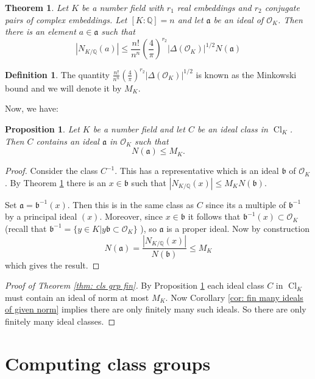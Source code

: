 \documentclass[11pt,a4paper]{report}
\theoremstyle{plain}
\newtheorem{thm}[subsection]{Theorem}
\newtheorem{prop}[subsection]{Proposition}
\theoremstyle{definition}
\newtheorem{defn}[subsection]{Definition}
\theoremstyle{definition}
\def\QQ{\mathbb{Q}}
\def\gothb{\mathfrak{b}}
\def \OO {\mathcal{O}}
\def\gotha{\mathfrak{a}}
\DeclareMathOperator{\Cl}{Cl}
\begin{document}
\begin{thm}\label{thm: mink bound}
	Let $K$ be a number field with $r_1$ real embeddings and $r_2$ conjugate pairs of complex embeddings. Let $[K:\QQ]=n$ and let $\gotha$ be an ideal of $\OO_K$. Then there is an element $a \in \gotha$ such that \[|N_{K/\QQ}(a)| \leq  \frac{n!}{n^n} \left( \frac{4}{\pi} \right)^{r_2} |\Delta(\OO_K)|^{1/2} N(\gotha) \]
\end{thm} 

\begin{defn}
	The quantity $ \frac{n!}{n^n} \left( \frac{4}{\pi} \right)^{r_2} |\Delta(\OO_K)|^{1/2}$ is known as the Minkowski bound and we will denote it by $M_K$.
\end{defn}

Now, we have:

\begin{prop}\label{prop: each ideal class has rep of small norm}
	Let $K$ be a number field and let $C$ be an ideal class in $\Cl_K$. Then $C$ contains an ideal $\gotha$ in $\OO_K$ such that \[N(\gotha) \leq M_K.\]
\end{prop}

\begin{proof}
	Consider the class $C^{-1}$. This has a representative which is an ideal $\gothb$ of $\OO_K$. By Theorem \ref{thm: mink bound} there is an $x \in \gothb$ such that $|N_{K/\QQ}(x)| \leq M_K N(\gothb)$.
	
	Set $\gotha=\gothb^{-1} (x)$. Then this is in the same class as $C$ since its a multiple of $\gothb^{-1}$ by a principal ideal $(x)$. Moreover, since $x \in \gothb$ it follows that $\gothb^{-1}(x) \subset \OO_K$ (recall that $\gothb^{-1}=\{y \in K | y\gothb \subset \OO_K\}$ ), so $\gotha$ is a proper ideal. Now by construction \[N(\gotha)=\frac{|N_{K/\QQ}(x)|}{N(\gothb)} \leq M_K\] which gives the result.
\end{proof}

\begin{proof}[Proof of Theorem \ref{thm: cls grp fin}]
	By Proposition \ref{prop: each ideal class has rep of small norm} each ideal class $C$ in $\Cl_K$ must contain an ideal of norm at most $M_K$. Now  Corollary \ref{cor: fin many ideals of given norm} implies there are only finitely many such ideals. So there are only finitely many ideal classes.
\end{proof}

\section{Computing class groups}
\end{document}
